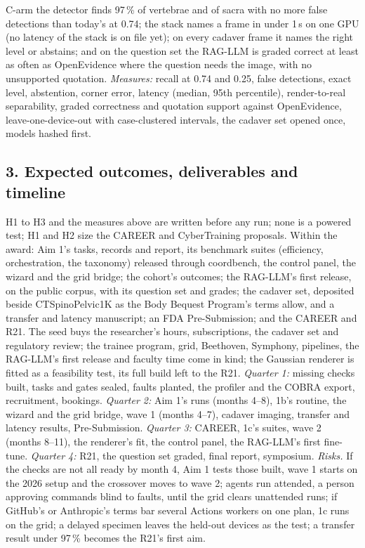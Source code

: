 \documentclass[10pt,letterpaper]{article}
\newcommand{\pct}{\,\%}
\begin{document}
C-arm the detector finds 97\pct{} of vertebrae and of sacra with no more false detections than today's at 0.74; the stack names a frame in under 1\,s on one GPU (no latency of the stack is on file yet); on every cadaver frame it names the right level or abstains;
and on the question set the RAG-LLM is graded correct at least as often as OpenEvidence where the question needs the
image, with no unsupported quotation. \emph{Measures:} recall at 0.74 and 0.25, false detections, exact level,
abstention, corner error, latency (median, 95th percentile), render-to-real separability, graded correctness and
quotation support against OpenEvidence, leave-one-device-out with case-clustered intervals, the cadaver set opened
once, models hashed first.

\subsection*{3. Expected outcomes, deliverables and timeline}
H1 to H3 and the measures above are written before any run; none is a powered test; H1 and H2 size the CAREER and
CyberTraining proposals. Within the award: Aim 1's tasks, records and report, its benchmark suites (efficiency,
orchestration, the taxonomy) released through coordbench, the control panel, the wizard and the grid bridge; the
cohort's outcomes; the RAG-LLM's first release, on the public corpus, with its question set and grades; the cadaver
set, deposited beside CTSpinoPelvic1K as the Body Bequest Program's terms allow, and a transfer and latency
manuscript; an FDA Pre-Submission; and the CAREER and R21. The seed buys the researcher's hours,
subscriptions, the cadaver set and regulatory review; the trainee program, grid, Beethoven, Symphony, pipelines, the RAG-LLM's first release and faculty time come in kind; the Gaussian renderer is fitted as a feasibility test, its full build left to the R21. \emph{Quarter 1:} missing checks built, tasks
and gates sealed, faults planted, the profiler and the COBRA export, recruitment, bookings. \emph{Quarter 2:} Aim 1's runs (months 4--8), 1b's routine, the wizard and the grid bridge, wave 1 (months 4--7), cadaver imaging, transfer and latency results,
Pre-Submission. \emph{Quarter 3:} CAREER, 1c's suites, wave 2 (months 8--11), the renderer's fit, the control panel, the RAG-LLM's
first fine-tune. \emph{Quarter 4:} R21, the question set graded, final report, symposium. \emph{Risks.} If the checks are not all ready by month 4, Aim 1 tests
those built, wave 1 starts on the 2026 setup and the crossover moves to wave 2; agents run attended, a person
approving commands blind to faults, until the grid clears unattended runs; if GitHub's or Anthropic's terms bar
several Actions workers on one plan, 1c runs on the grid; a delayed specimen leaves the held-out devices as the test;
a transfer result under 97\pct{} becomes the R21's first aim.
\end{document}
